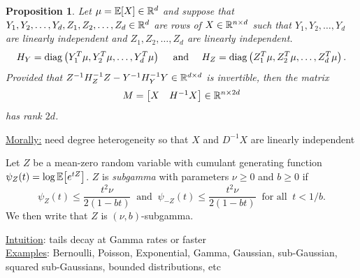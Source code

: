 \documentclass[aspectratio=169]{beamer}
\newtheorem{proposition}{Proposition}
\theoremstyle{remark}
\begin{document}
\begin{frame}

    \begin{proposition}
        \label{prop:XHX-rank}
        Let $\mu = \E{X} \in \R^d$ and suppose that $Y_1,Y_2,\dots,Y_d,Z_1,Z_2,\dots,Z_d \in \mathbb{R}^d$ are rows of $X \in \mathbb{R}^{n \times d}$ such that $Y_1,Y_2,\dots,Y_d$ are linearly independent and $Z_1,Z_2,\dots,Z_d$ are linearly independent.
        \begin{equation*}
            H_Y = \operatorname*{diag}\left( Y_1^T \mu, Y_2^T \mu, \dots, Y_d^T \mu \right)
            ~~~\text{ and }~~~
            H_Z = \operatorname*{diag}\left( Z_1^T \mu, Z_2^T \mu, \dots, Z_d^T \mu \right).
        \end{equation*}
        Provided that $Z^{-1} H_Z^{-1} Z - Y^{-1} H_Y^{-1} Y \in \mathbb{R}^{d \times d}$ is invertible, then the matrix
        \begin{equation*} \label{eq:targetmx}
            M = \begin{bmatrix} X & H^{-1} X \end{bmatrix} \in \mathbb{R}^{n \times 2d}
        \end{equation*}
        has rank $2d$.
    \end{proposition}
    \underline{Morally:} need degree heterogeneity so that $X$ and $D^{-1} X$ are linearly independent
\end{frame}

\begin{frame}
    \begin{definition}
        Let $Z$ be a mean-zero random variable with cumulant generating function $\psi_Z(t) = \log \E{e^{t Z}}$.
        $Z$ is \emph{subgamma} with parameters $\nu \ge 0$ and $b \ge 0$ if
        \begin{equation*}
            \psi_Z(t) \le \frac{t^2 \nu}{2 (1 - b t)}
            ~\text{ and }~
            \psi_{-Z}(t) \le \frac{t^2 \nu}{2 (1 - b t)}
            ~\text{ for all }~ t < 1 / b.
        \end{equation*}
        We then write that $Z$ is $(\nu,b)$-subgamma.
    \end{definition}
    \vspace{4mm}
    \underline{Intuition}: tails decay at Gamma rates or faster \\
    \vspace{4mm}
    \underline{Examples}: Bernoulli, Poisson, Exponential, Gamma, Gaussian, sub-Gaussian, squared sub-Gaussians, bounded distributions, etc
\end{frame}
\end{document}
